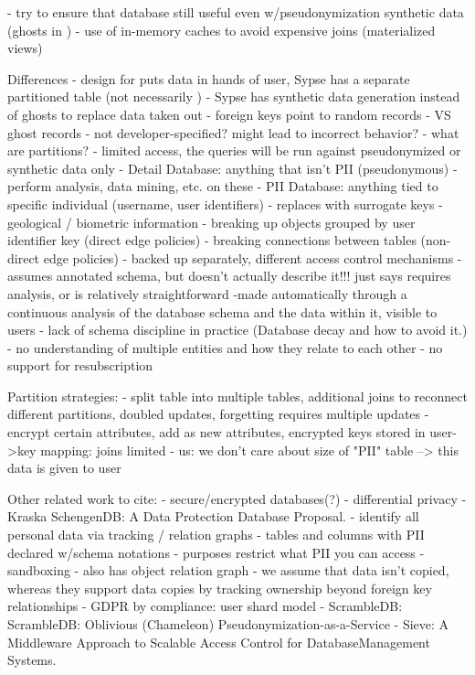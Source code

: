 - try to ensure that database still useful even w/pseudonymization
    synthetic data (ghosts in \name)
- use of in-memory caches to avoid expensive joins (materialized views)

Differences
- design for \name puts data in hands of user, Sypse has a separate partitioned table (not
necessarily )
- Sypse has synthetic data generation instead of ghosts to replace data taken out
    - foreign keys point to random records
    - VS ghost records
    - not developer-specified? might lead to incorrect behavior?
- what are partitions?
    - limited access, the queries will be run against pseudonymized or synthetic data only
    - Detail Database: anything that isn't PII (pseudonymous)
        - perform analysis, data mining, etc. on these
    - PII Database: anything tied to specific individual (username, user identifiers)
        - replaces with surrogate keys
        - geological / biometric information
        - breaking up objects grouped by user identifier key (direct edge policies)
        - breaking connections between tables (non-direct edge policies)
    - backed up separately, different access control mechanisms
- assumes annotated schema, but doesn't actually describe it!!! just says requires analysis, or is
relatively straightforward
    -made automatically through a continuous analysis of the database schema and the data within it,
    visible to users
    - lack of schema discipline in practice (Database decay and how to avoid it.)
    - no understanding of multiple entities and how they relate to each other
- no support for resubscription

Partition strategies:
- split table into multiple tables, additional joins to reconnect different partitions, doubled updates, forgetting requires multiple
updates
- encrypt certain attributes, add as new attributes, encrypted keys stored in user->key mapping: joins limited
- us: we don't care about size of "PII" table --> this data is given to user

Other related work to cite:
- secure/encrypted databases(?)
- differential privacy
- Kraska SchengenDB: A Data Protection Database Proposal.
    - identify all personal data via tracking / relation graphs
    - tables and columns with PII declared w/schema notations
    - purposes restrict what PII you can access
    - sandboxing
    - also has object relation graph
    - we assume that data isn't copied, whereas they support data copies by tracking ownership
    beyond foreign key relationships
- GDPR by compliance: user shard model
- ScrambleDB: ScrambleDB: Oblivious (Chameleon) Pseudonymization-as-a-Service
- Sieve: A Middleware Approach to Scalable Access Control for DatabaseManagement Systems.

